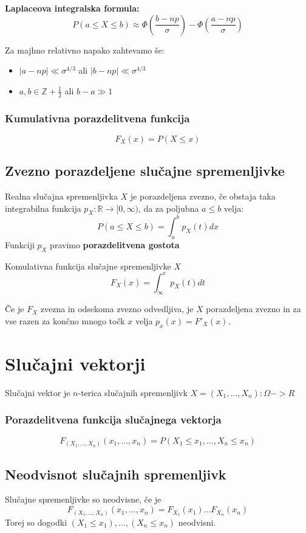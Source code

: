 \begin{multicols}{5}
\textbf{Laplaceova integralska formula: }
\[ P(a \leq X \leq b) \approx \Phi\left( \frac{b - np}{\sigma} \right) - \Phi\left( \frac{a - np}{\sigma} \right) \]

Za majhno relativno napako zahtevamo še: 
\begin{itemize}
	\item $|a-np| \ll \sigma^{4/3}$ ali $|b-np| \ll \sigma^{4/3}$ 
	\item $a, b \in \mathbb{Z} + \frac{1}{2}$ ali $b - a \gg 1$
\end{itemize}

\subsubsection{Kumulativna porazdelitvena funkcija}
\[ F_X(x) = P(X \leq x)\]

\subsection{Zvezno porazdeljene slučajne spremenljivke}
Realna slučajna spremenljivka $X$ je porazdeljena zvezno, če obstaja taka integrabilna funkcija $p_X: \mathbb{R} \to [0, \infty)$, da za poljubna $a \leq b$ velja:
\[ P( a \leq X \leq b) = \int_a^b p_X(t) dx \]
Funkciji $p_X$ pravimo \textbf{porazdelitvena gostota}


Komulativna funkcija slučajne spremenljivke $X$
\[ F_X(x) = \int_{\infty}^x p_X(t) dt \]

Če je $F_X$ zvezna in odsekoma zvezno odvedljiva, je $X$ porazdeljena zvezno in za vse razen za končno mnogo točk $x$ velja $p_x(x) = F'_X(x)$.

\section{Slučajni vektorji}
Slučajni vektor je $n$-terica slučajnih spremenljivk $X = (X_1, \dots , X_n): \Omega -> R$ 

\subsubsection{Porazdelitvena funkcija slučajnega vektorja}
\[ F_{(X_1, \dots , X_n)}(x_1, \dots , x_n) = P(X_1 \leq x_1, \dots , X_n \leq x_n)\]

\subsection{Neodvisnot slučajnih spremenljivk}
Slučajne spremenljivke so neodvisne, če je
\[ F_{(X_1, \dots , X_n)}(x_1, \dots, x_n) = F_{X_1}(x_1) \dots F_{X_n}(x_n)\]
Torej so dogodki $(X_1 \leq x_1), \dots , (X_n \leq x_n)$ neodvisni.


\end{multicols}
